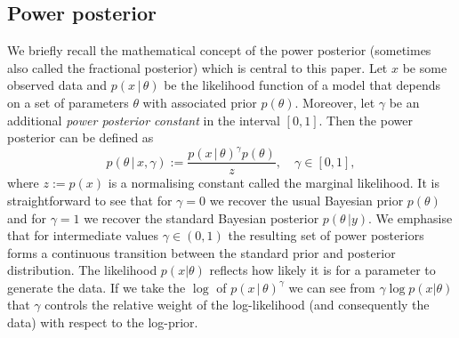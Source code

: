 \documentclass[12pt]{article}
\begin{document}
\subsection{Power posterior}
We briefly recall the mathematical concept of the power posterior (sometimes
also called the fractional posterior) which is central to this paper. Let $x$
be some observed data and $p(x\, | \, \theta)$ be the likelihood function of a
model that depends on a set of parameters $\theta$ with associated prior
$p(\theta)$. Moreover, let $\gamma$ be an additional \emph{power posterior
constant} in the interval $[0, 1]$. Then the power posterior
\citep{friel2008marginal} can be defined as
\begin{equation}
\label{eq:pow_pos}
p(\theta \, | \, x,\gamma) := \frac{p(x \, | \, \theta)^\gamma p(\theta)}{z}, \quad \gamma \in [0, 1],
\end{equation}
where $z := p(x)$ is a normalising constant called the marginal likelihood. It
is straightforward to see that for $\gamma = 0$ we recover the usual Bayesian
prior $p(\theta)$ and for $\gamma = 1$ we recover the standard Bayesian
posterior $p(\theta \, | y)$. We emphasise that for intermediate values $\gamma
\in (0, 1)$ the resulting set of power posteriors forms a continuous
transition between the standard prior and posterior distribution. The likelihood  $p(x|\theta)$ reflects how likely it is for a parameter to generate the data. If we take the $\log$ of $p(x \, | \, \theta)^\gamma$ we can see from $\gamma \log p(x|\theta)$ that $\gamma$ 
controls the relative weight of the log-likelihood (and consequently the data) with respect to the log-prior.
\end{document}
